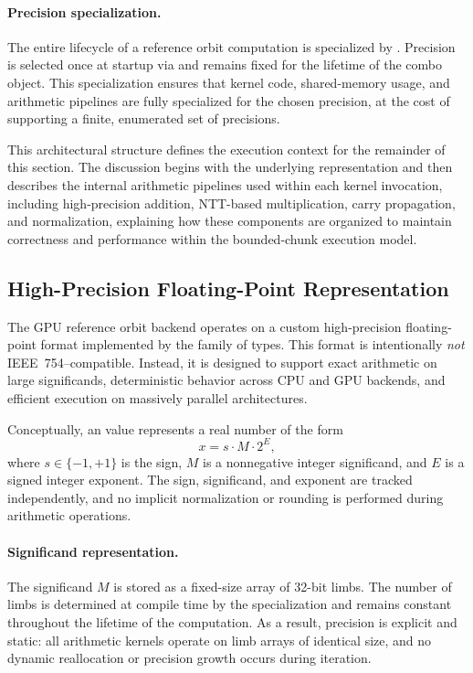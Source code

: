 \paragraph{Precision specialization.}
The entire lifecycle of a reference orbit computation is specialized by
. Precision is selected once at startup via
 and remains fixed for the lifetime of the combo
object. This specialization ensures that kernel code, shared-memory usage, and arithmetic
pipelines are fully specialized for the chosen precision, at the cost of
supporting a finite, enumerated set of precisions.

\medskip

This architectural structure defines the execution context for the remainder of
this section. The discussion begins with the underlying 
representation and then describes the internal arithmetic pipelines used within
each kernel invocation, including high-precision addition, NTT-based
multiplication, carry propagation, and normalization, explaining how these
components are organized to maintain correctness and performance within the
bounded-chunk execution model.

\subsection{High-Precision Floating-Point Representation}
\label{subsec:hpfloat-model}

The GPU reference orbit backend operates on a custom high-precision
floating-point format implemented by the  family of types.
This format is intentionally \emph{not} IEEE~754--compatible. Instead, it is
designed to support exact arithmetic on large significands, deterministic
behavior across CPU and GPU backends, and efficient execution on massively
parallel architectures.

Conceptually, an  value represents a real number of the
form
\[
x = s \cdot M \cdot 2^E,
\]
where $s \in \{-1,+1\}$ is the sign, $M$ is a nonnegative integer significand,
and $E$ is a signed integer exponent. The sign, significand, and exponent are
tracked independently, and no implicit normalization or rounding is performed
during arithmetic operations.

\paragraph{Significand representation.}
The significand $M$ is stored as a fixed-size array of 32-bit limbs. The number
of limbs is determined at compile time by the
 specialization and remains constant throughout the
lifetime of the computation. As a result, precision is explicit and static:
all arithmetic kernels operate on limb arrays of identical size, and no dynamic
reallocation or precision growth occurs during iteration.

